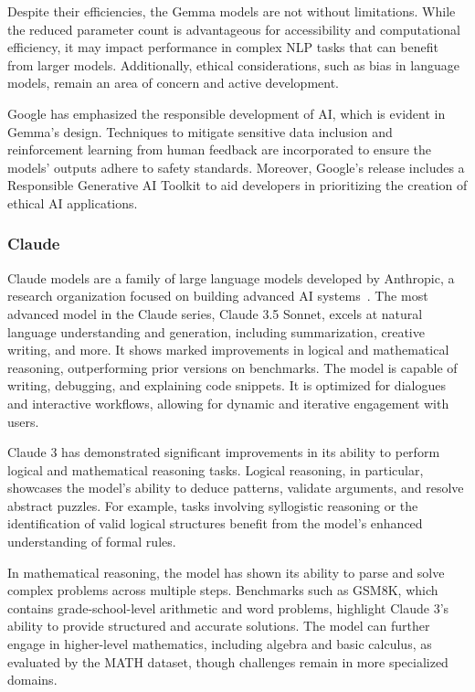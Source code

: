 Despite their efficiencies, the Gemma models are not without limitations.
While the reduced parameter count is advantageous for accessibility and computational efficiency, it may impact performance in complex NLP tasks that can benefit from larger models.
Additionally, ethical considerations, such as bias in language models, remain an area of concern and active development.

Google has emphasized the responsible development of AI, which is evident in Gemma's design.
Techniques to mitigate sensitive data inclusion and reinforcement learning from human feedback are incorporated to ensure the models' outputs adhere to safety standards.
Moreover, Google's release includes a Responsible Generative AI Toolkit to aid developers in prioritizing the creation of ethical AI applications.

\subsubsection{Claude}
\label{subsubsec:claude}


Claude models are a family of large language models developed by Anthropic, a research organization focused on building advanced AI systems~\cite{anthropic2024claude3}.
The most advanced model in the Claude series, Claude 3.5 Sonnet, excels at natural language understanding and generation, including summarization, creative writing, and more.
It shows marked improvements in logical and mathematical reasoning, outperforming prior versions on benchmarks.
The model is capable of writing, debugging, and explaining code snippets.
It is optimized for dialogues and interactive workflows, allowing for dynamic and iterative engagement with users.

Claude 3 has demonstrated significant improvements in its ability to perform logical and mathematical reasoning tasks.
Logical reasoning, in particular, showcases the model's ability to deduce patterns, validate arguments, and resolve abstract puzzles.
For example, tasks involving syllogistic reasoning or the identification of valid logical structures benefit from the model's enhanced understanding of formal rules.

In mathematical reasoning, the model has shown its ability to parse and solve complex problems across multiple steps.
Benchmarks such as GSM8K, which contains grade-school-level arithmetic and word problems, highlight Claude 3's ability to provide structured and accurate solutions.
The model can further engage in higher-level mathematics, including algebra and basic calculus, as evaluated by the MATH dataset, though challenges remain in more specialized domains.


